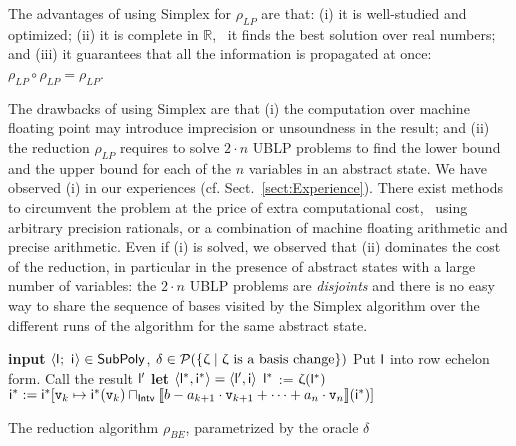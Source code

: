 \documentclass{llncs}
\begin{document}
The advantages of using Simplex for  $\rho_\mathit{LP}$ are that: (i) it is well-studied and optimized; (ii) it is complete in $\mathbb{R}$, \ie\ it finds the best solution over real numbers; and (iii) it guarantees that all the information is propagated at once: $\rho_\mathit{LP} \circ \rho_\mathit{LP} = \rho_\mathit{LP}$.

The drawbacks of using Simplex are that (i) the computation over machine floating point  may introduce imprecision or unsoundness in the result; and (ii) the reduction $\rho_\mathit{LP}$ requires to solve $2 \cdot n$ UBLP problems to find the lower bound and the upper bound for each of the $n$ variables in an abstract state.
We have observed (i) in our experiences (cf. Sect.~\ref{sect:Experience}). 
There exist methods to circumvent the problem at the price of extra computational cost, \eg\ using arbitrary precision rationals, or a combination of machine floating arithmetic and precise arithmetic.
Even if (i) is solved, we observed that (ii) dominates the cost of the
reduction, in particular in the presence of abstract states with a large number of variables: the $2 \cdot n$ UBLP problems are \emph{disjoints} and there is no easy way to share the sequence of bases visited by the Simplex algorithm over the different runs of the algorithm for the same abstract state.

\begin{algorithm}[t]
\begin{algorithmic}
\STATE \textbf{input} $\langle \mathsf{\mathsf{l}}_{}^{};\ \mathsf{\mathsf{i}}_{}^{} \rangle \in \mathsf{SubPoly}$, $\delta \in \mathcal{P}{(\{ \upzeta \mid \upzeta\ \text{is a basis change}\})} $
\medskip
\STATE Put $\mathsf{\mathsf{l}}$ into row echelon form. Call the result $\mathsf{\mathsf{l}}'$
\STATE \textbf{let} $\langle \mathsf{\mathsf{l}}^*, \mathsf{\mathsf{i}}^* \rangle =  \langle \mathsf{\mathsf{l}}', \mathsf{\mathsf{i}} \rangle$
\FORALL{$\upzeta \in \delta$}
 \STATE $\mathsf{\mathsf{l}}^*$ := $\upzeta(\mathsf{\mathsf{l}}^*)$
 \STATE $\mathsf{\mathsf{i}}^* := \mathsf{\mathsf{i}}^*[\mathtt{v}_k \mapsto \mathsf{\mathsf{i}}^*(\mathtt{v}_k) \sqcap_{\mathsf{Intv}} \llbracket b-a_{k+1}\cdot \mathtt{v}_{k+1} + \dots + a_n\cdot \mathtt{v}_{n}\rrbracket(\mathsf{\mathsf{i}}^*)]$  
 \ENDFOR
\ENDFOR
\smallskip
\RETURN \tupla{\lineq^*, \intv^*}
\end{algorithmic}
\caption{The reduction algorithm $\rho_\mathit{BE}$, parametrized by the oracle $\delta$}
\label{alg:reduction}
\end{algorithm}
\end{document}
